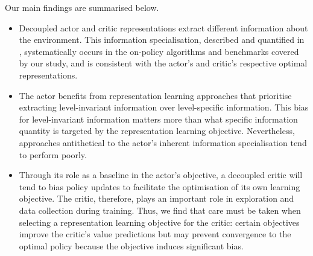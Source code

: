 %
\begin{tcolorbox}[colback=gray!10,
leftrule=0.5mm,top=0mm,bottom=0mm]
Our main findings are summarised below.\begin{itemize}[leftmargin=*]
    \item Decoupled actor and critic representations extract different information about the environment. This information specialisation, described and quantified in , systematically occurs in the on-policy algorithms and benchmarks covered by our study, and is consistent with the actor's and critic's respective optimal representations.
    \item The actor benefits from representation learning approaches that prioritise extracting level-invariant information over level-specific information. This bias for level-invariant information matters more than what specific information quantity is targeted by the representation learning objective. Nevertheless, approaches antithetical to the actor's inherent information specialisation tend to perform poorly.
    \item Through its role as a baseline in the actor's objective, a decoupled critic will tend to bias policy updates to facilitate the optimisation of its own learning objective. The critic, therefore, plays an important role in exploration and data collection during training. Thus, we find that care must be taken when selecting a representation learning objective for the critic: certain objectives improve the critic's value predictions but may prevent convergence to the optimal policy because the objective induces significant bias.
\end{itemize}
%
\end{tcolorbox}


